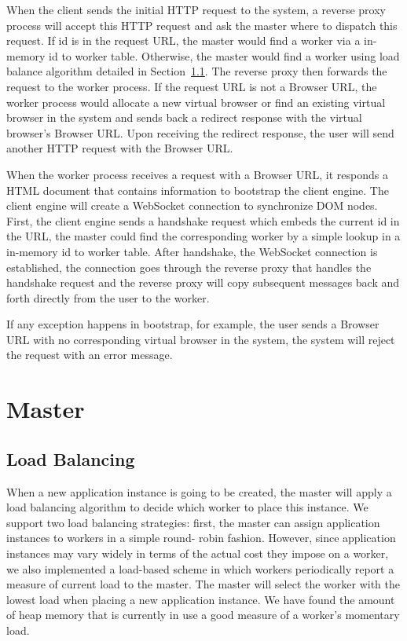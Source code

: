When the client sends the initial HTTP request to the system, a reverse proxy
process will accept this HTTP request and ask the master where to dispatch this
request. If \appins id is in the request URL, the master would find a worker via
a in-memory \appins id to worker table. Otherwise, the master would find a
worker using load balance algorithm detailed in Section~\ref{sec:lb}. The
reverse proxy then forwards the request to the worker process. If the request
URL is not a Browser URL, the worker process would allocate a new virtual
browser or find an existing virtual browser in the system and sends back a
redirect response with the virtual browser's Browser URL. Upon receiving the
redirect response, the user will send another HTTP request with the Browser URL.

When the worker process receives a request with a Browser URL, it responds a
HTML document that contains information to bootstrap the client engine. The
client engine will create a WebSocket connection to synchronize DOM nodes.
First, the client engine sends a handshake request which embeds the current
\appins id in the URL, the master could find the corresponding worker by a
simple lookup in a in-memory \appins id to worker table. After handshake,  the
WebSocket connection is established, the connection goes through  the reverse
proxy that handles the handshake request and the reverse proxy will copy
subsequent messages back and forth directly from the user to the worker.

If any exception happens in bootstrap, for example, the user sends a Browser URL
with no corresponding virtual browser in the system, the system will reject the
request with an error message.


\section{Master}





\subsection{Load Balancing} 
\label{sec:lb} 
When a new application instance is
going to be created, the master will apply a load balancing algorithm to decide
which worker to place this instance.   We support two load balancing strategies:
first, the master can assign application instances to workers in a simple round-
robin fashion.   However, since application instances may vary widely in terms
of the actual cost they impose on a worker, we also implemented a load-based
scheme in which workers periodically report a measure of current load to the
master. The master will select the worker with the lowest load when placing a
new application instance. We have found the amount of heap memory that is
currently in use a good measure of a worker's  momentary load.

